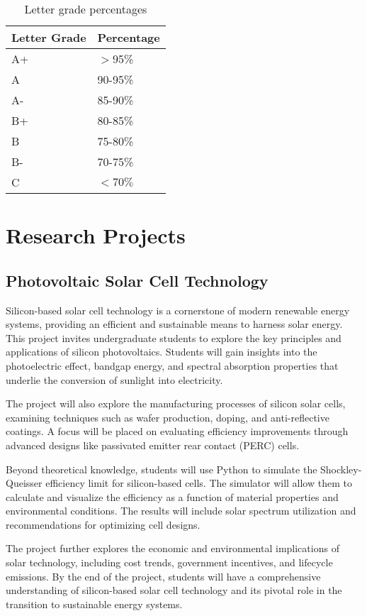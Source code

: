 \documentclass[11pt]{article}
\begin{document}
	\begin{table}[h!]
	    \centering
	    \begin{tabular}{|l|l|}
	         	\hline\hline
	Letter Grade	& Percentage		\\
		\hline\hline  
		A+	& $>$95\%	\\
		A	& 90-95\%	\\
		A-	& 85-90\%	\\
		B+	& 80-85\%	\\
		B & 75-80\%\\
		B-& 70-75\%\\
		C&$<70\%$\\
		\hline\hline
	    \end{tabular}
	    \caption{Letter grade percentages}
	    \label{tab:grades2}
	\end{table}
	
	\newpage
    \section{Research Projects}
\subsection{Photovoltaic Solar Cell Technology}

Silicon-based solar cell technology is a cornerstone of modern renewable energy systems, providing an efficient and sustainable means to harness solar energy. This project invites undergraduate students to explore the key principles and applications of silicon photovoltaics. Students will gain insights into the photoelectric effect, bandgap energy, and spectral absorption properties that underlie the conversion of sunlight into electricity. 

The project will also explore the manufacturing processes of silicon solar cells, examining techniques such as wafer production, doping, and anti-reflective coatings. A focus will be placed on evaluating efficiency improvements through advanced designs like passivated emitter rear contact (PERC) cells.

Beyond theoretical knowledge, students will use Python to simulate the Shockley-Queisser efficiency limit for silicon-based cells. The simulator will allow them to calculate and visualize the efficiency as a function of material properties and environmental conditions. The results will include solar spectrum utilization and recommendations for optimizing cell designs.

The project further explores the economic and environmental implications of solar technology, including cost trends, government incentives, and lifecycle emissions. By the end of the project, students will have a comprehensive understanding of silicon-based solar cell technology and its pivotal role in the transition to sustainable energy systems.
\end{document}
